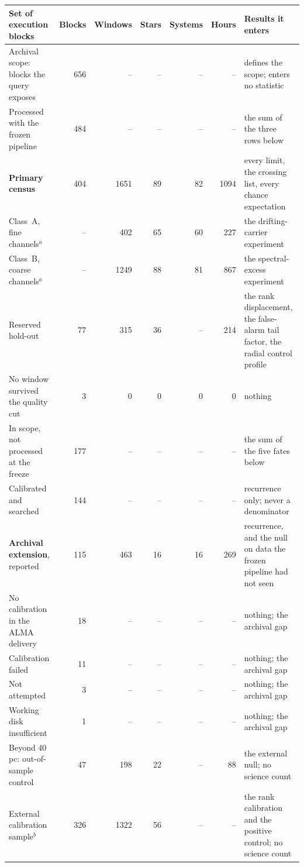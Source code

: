 \begin{tabular}{@{}p{}rrrrrp{}@{}}
\hline
Set of execution blocks & Blocks & Windows & Stars & Systems & Hours & Results it enters \\
\hline
Archival scope: blocks the query exposes & 656 & -- & -- & -- & -- & defines the scope; enters no statistic \\
Processed with the frozen pipeline & 484 & -- & -- & -- & -- & the sum of the three rows below \\
\hspace{1.1em}\textbf{Primary census} & 404 & 1651 & 89 & 82 & 1094 & every limit, the crossing list, every chance expectation \\
\hspace{2.2em}Class~A, fine channels$^{a}$ & -- & 402 & 65 & 60 & 227 & the drifting-carrier experiment \\
\hspace{2.2em}Class~B, coarse channels$^{a}$ & -- & 1249 & 88 & 81 & 867 & the spectral-excess experiment \\
\hspace{1.1em}Reserved hold-out & 77 & 315 & 36 & -- & 214 & the rank displacement, the false-alarm tail factor, the radial control profile \\
\hspace{1.1em}No window survived the quality cut & 3 & 0 & 0 & 0 & 0 & nothing \\
\hline
In scope, not processed at the freeze & 177 & -- & -- & -- & -- & the sum of the five fates below \\
\hspace{1.1em}Calibrated and searched & 144 & -- & -- & -- & -- & recurrence only; never a denominator \\
\hspace{2.2em}\textbf{Archival extension}, reported & 115 & 463 & 16 & 16 & 269 & recurrence, and the null on data the frozen pipeline had not seen \\
\hspace{1.1em}No calibration in the ALMA delivery & 18 & -- & -- & -- & -- & nothing; the archival gap \\
\hspace{1.1em}Calibration failed & 11 & -- & -- & -- & -- & nothing; the archival gap \\
\hspace{1.1em}Not attempted & 3 & -- & -- & -- & -- & nothing; the archival gap \\
\hspace{1.1em}Working disk insufficient & 1 & -- & -- & -- & -- & nothing; the archival gap \\
\hline
Beyond 40\,pc: out-of-sample control & 47 & 198 & 22 & -- & 88 & the external null; no science count \\
External calibration sample$^{b}$ & 326 & 1322 & 56 & -- & -- & the rank calibration and the positive control; no science count \\
\hline
\end{tabular}

